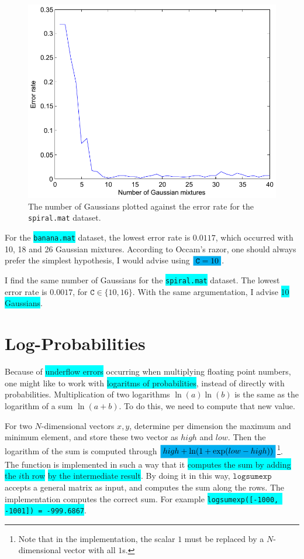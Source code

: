 \documentclass[a4paper,11pt]{article}
\newcommand{\T}[1]{\ensuremath{\mathtt{#1}}}
\newcommand{\hl}[1]{\colorbox{cyan}{#1}}
\newcommand{\mhl}[1]{\mathchoice%
  {\colorbox{cyan}{$\displaystyle#1$}}%
  {\colorbox{cyan}{$\textstyle#1$}}%
  {\colorbox{cyan}{$\scriptstyle#1$}}%
  {\colorbox{cyan}{$\scriptscriptstyle#1$}}}
\begin{document}
\begin{figure}
\begin{center}
\caption{The number of Gaussians plotted against the error rate for the \texttt{spiral.mat} dataset.}
\label{fig:spiralerr}
\includegraphics[width=\textwidth]{spiralerr}
\end{center}
\end{figure}

For the \hl{\texttt{banana.mat}} dataset, the lowest error rate is $0.0117$, which occurred with 10, 18 and 26 Gaussian mixtures.  According to Occam's razor, one should always prefer the simplest hypothesis, I would advise using $\mhl{\T{C} = 10}$.

I find the same number of Gaussians for the \hl{\texttt{spiral.mat}} dataset.  The lowest error rate is $0.0017$, for $\T{C} \in \{10, 16\}$.  With the same argumentation, I advise \hl{10 Gaussians}.


\section{Log-Probabilities}
Because of \hl{underflow errors} occurring when multiplying floating point numbers, one might like to work with \hl{logaritms of probabilities}, instead of directly with probabilities.  Multiplication of two logarithms $\ln(a) \ln(b)$ is the same as the logarithm of a sum $\ln(a+b)$.  To do this, we need to compute that new value.

For two $N$-dimensional vectors $x, y$, determine per dimension the maximum and minimum element, and store these two vector as $high$ and $low$.  Then the logarithm of the sum is computed through $\mhl{high + \ln(1 + \exp(low - high))}$\footnote{Note that in the implementation, the scalar $1$ must be replaced by a $N$-dimensional vector with all $1$s.}.  The function is implemented in such a way that it \hl{computes the sum by adding the $i$th row} \hl{by the intermediate result}.  By doing it in this way, $\T{logsumexp}$ accepts a general matrix as input, and computes the sum along the rows.  The implementation computes the correct sum.  For example \texttt{\hl{logsumexp([-1000, -1001]) = -999.6867}}.
\end{document}
